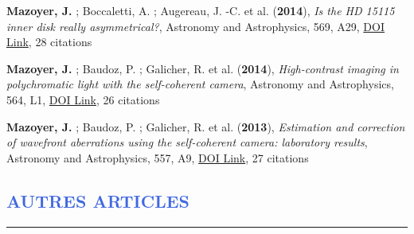 \documentclass[11pt, a4paper, french]{article}
\begin{document}
\begin{etaremune}
 \item {\bf Mazoyer, J.} ; Boccaletti, A. ; Augereau, J. -C. et al. ({\bf2014}), {\it Is the HD 15115 inner disk really asymmetrical?}, Astronomy and Astrophysics, 569, A29, \href{https://doi.org/10.1051/0004-6361/201424479}{DOI Link}, 28 citations

 \item {\bf Mazoyer, J.} ; Baudoz, P. ; Galicher, R. et al. ({\bf2014}), {\it High-contrast imaging in polychromatic light with the self-coherent camera}, Astronomy and Astrophysics, 564, L1, \href{https://doi.org/10.1051/0004-6361/201423375}{DOI Link}, 26 citations

 \item {\bf Mazoyer, J.} ; Baudoz, P. ; Galicher, R. et al. ({\bf2013}), {\it Estimation and correction of wavefront aberrations using the self-coherent camera: laboratory results}, Astronomy and Astrophysics, 557, A9, \href{https://doi.org/10.1051/0004-6361/201321706}{DOI Link}, 27 citations

 \end{etaremune}



\vspace{-0.5cm}
\textcolor{RoyalBlue}{\section{AUTRES ARTICLES}
\vspace{-0.25cm}\hrule}
\vspace{0.6cm}
\end{document}
